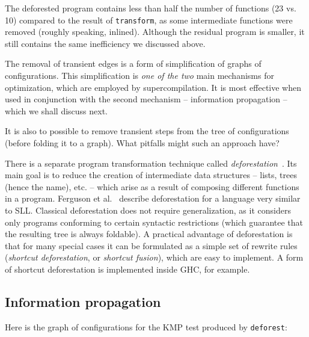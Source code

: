 The deforested program contains less than half the number of functions (23 vs. 10)
compared to the result of \texttt{transform},
as some intermediate functions were removed (roughly speaking, inlined).
Although the residual program is smaller, it still contains the same inefficiency 
we discussed above.

The removal of transient edges is a form of simplification of graphs of configurations.
This simplification is \emph{one of the two} main mechanisms for optimization,
which are employed by supercompilation. 
It is most effective when used in conjunction with the second mechanism
-- information propagation -- which we shall discuss next.

\begin{exercise}
It is also to possible to remove transient steps from the tree of configurations (before folding it to a graph).
What pitfalls might such an approach have?
\end{exercise}


There is a separate program transformation technique 
called \emph{deforestation}~\cite{Wadler1988deforestation,Ferguson1988When}.
Its main goal is to reduce the creation of intermediate data structures
-- lists, trees (hence the name), etc. -- which arise as a result of
composing different functions in a program.
Ferguson et al.~\cite{Ferguson1988When} describe deforestation for a language
very similar to SLL\@.
Classical deforestation does not require generalization, as it considers
only programs conforming to certain syntactic restrictions
(which guarantee that the resulting tree is always foldable).
A practical advantage of deforestation is that for
many special cases it can be formulated as a simple set of
rewrite rules (\emph{shortcut deforestation}, or \emph{shortcut fusion}),
which are easy to implement. 
A form of shortcut deforestation is implemented inside GHC, for example.

\subsection{Information propagation}

Here is the graph of configurations for the KMP test produced by \texttt{deforest}:\\



